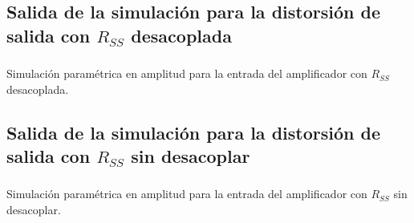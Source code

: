 \subsection{Salida de la simulación para la distorsión de salida con $R_{SS}$ desacoplada}

\subsubsection{}
\label{OUT_FILE_DIST_WO_RSS}
Simulación paramétrica en amplitud para la entrada del amplificador con $R_{SS}$ desacoplada.\\

\begin{flushleft}
\end{flushleft}

\fontsize{5pt}{6pt}
\selectfont



\normalfont
\normalsize
\selectfont



\clearpage



\subsection{Salida de la simulación para la distorsión de salida con $R_{SS}$ sin desacoplar}

\subsubsection{}
\label{OUT_FILE_DIST_W_RSS}
Simulación paramétrica en amplitud para la entrada del amplificador con $R_{SS}$ sin desacoplar.\\

\begin{flushleft}
\end{flushleft}

\fontsize{5pt}{6pt}
\selectfont



\normalfont
\normalsize
\selectfont

